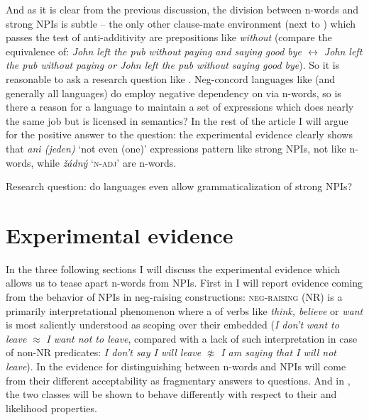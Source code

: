 \documentclass[output=paper, colorlinks, citecolor=brown, newtxmath]{langsci/langscibook}
\begin{document}
And as it is clear from the previous discussion, the division between n-words and strong NPIs is subtle -- the only other clause-mate environment (next to ) which passes the test of anti-additivity are prepositions like  \textit{without} (compare the equivalence of: \textit{John left the pub without paying and saying good bye $\leftrightarrow$ John left the pub without paying or John left the pub without saying good bye}). So it is reasonable to ask a research question like . Neg-concord languages like  (and generally all  languages) do employ negative dependency on  via n-words, so is there a reason for a language to maintain a set of expressions which does nearly the same job but is licensed in semantics? In the rest of the article I will argue for the positive answer to the question: the experimental evidence clearly shows that \textit{ani (jeden)} `not even (one)' expressions pattern like strong NPIs, not like n-words, while \textit{žádný} `\textsc{n-adj}' are n-words.

\eanoraggedright\label{ex-23} Research question: do  languages even allow grammaticalization of strong NPIs?
\z

\section{Experimental evidence}\label{experimental-evidence}

In the three following sections I will discuss the experimental evidence which allows us to tease apart n-words from NPIs. First in  I will report evidence coming from the behavior of NPIs in neg-raising constructions: \textsc{neg-raising} (NR) is a primarily interpretational phenomenon where a  of verbs like \textit{think, believe} or \textit{want} is most saliently understood as scoping over their embedded  (\textit{I don't want to leave} $\approx$ \textit{I want not to leave}, compared with a lack of such interpretation in case of non-NR predicates: \textit{I don't say I will leave} $\not\approx$ \textit{I am saying that I will not leave}). In  the evidence for distinguishing between n-words and NPIs will come from their different acceptability as fragmentary answers to questions. And in , the two classes will be shown to behave differently with respect to their  and likelihood properties.
\end{document}
